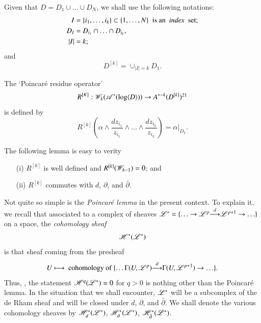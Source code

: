 Given that $D = D_1 \cup \ldots \cup D_N$, we shall use the following notations:
\begin{align*}
I & = \{i_1, \ldots , i_k\} \subset \{1, \ldots, N\} \; \text{ is an \textit{ index } set;}\\
D_I & = D_{i_1} \cap \ldots \cap D_{i_k},\\
|I| & = k;
\end{align*}
and 
$$
D^{[k]} = \cup_{|I|=k} D_1.
$$

\begin{defi*}
The `Poincar\'e residue operator'
$$
R^{[K]}: \sW_k (\sA^\ast (\log \langle D \rangle)) \to A^{\ast -k} (D^{[k]})\footnotemark[21]{}
$$
is defined by 
\begin{equation}
R^{[k]} \left(\alpha \wedge \frac{dz_{i_1}}{z_{i_1}} \wedge \ldots \wedge \frac{dz_{i_k}}{z_{i_k}} \right)  = \alpha|_{D_I}. 
\label{art4-eq5.11}
\end{equation}
\end{defi*}

The following lemma is easy to verity

\setcounter{lemma}{11}
\begin{lemma}\label{art4-lem12}
\begin{itemize}
\item[(i)] $R^{[k]}$ is well defined and $R^{[k]} (\mathscr{W}_{k-1}) = 0$; and 

\item[(ii)] $R^{[k]}$ commutes with $d$, $\partial$, and  $\bar{\partial}$.
\end{itemize}
\end{lemma}

Not quite so simple is the \textit{Poincar\'e lemma} in the present context. To explain it, we recall that associated to a complex of sheaves $\mathscr{L}^\ast = \{\ldots \to \mathscr{L}^p {\displaystyle{\mathop{\longrightarrow}^d}} \mathscr{L}^{p+1} \to \ldots \}$\pageoriginale on a space, the \textit{cohomology sheaf}
$$
\mathscr{H}^\ast (\mathscr{L}^\ast)
$$
is that sheaf coming from the presheaf
$$
U \longmapsto \text{ cohomology of } \{ \ldots \Gamma (U, \mathscr{L}^p) {\displaystyle{\mathop{\longrightarrow}^d}} \Gamma (U, \mathscr{L}^{p+1}) \to \ldots \}.
$$
Thus, \eg, the statement $\mathscr{H}^q (\mathscr{L}^\ast) = 0$ for $q>0$ is nothing other than the Poincar\'e lemma. In the situation that we shall encounter, $\mathscr{L}^\ast$ will be a subcomplex of the de Rham sheaf and will be closed under $d$, $\partial$, and $\bar{\partial}$. We shall denote the various cohomology sheaves by $\mathscr{H}^\ast_d (\mathscr{L}^\ast)$, $\mathscr{H}^\ast_\partial (\mathscr{L}^\ast)$, $\mathscr{H}^\ast_{\bar{\partial}}(\mathscr{L}^\ast)$.

